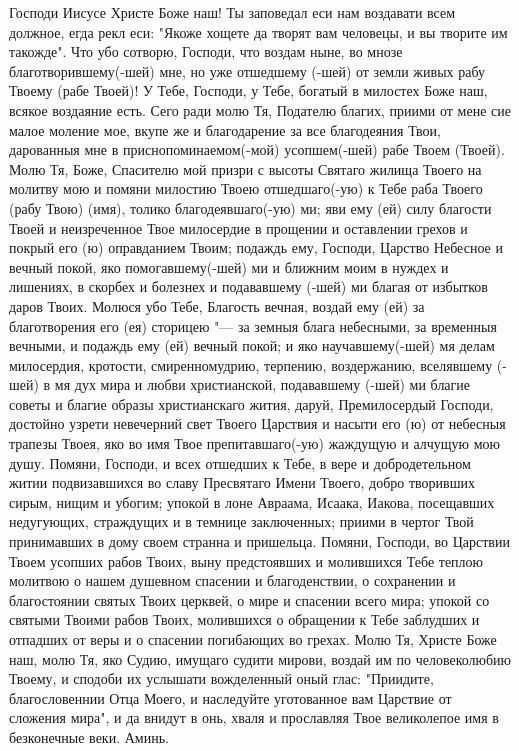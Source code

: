 \mychapterending

 


Господи Иисусе Христе Боже наш! Ты заповедал еси нам воздавати всем должное, егда рекл еси: "Якоже хощете да творят вам человецы, и вы творите им такожде". Что убо сотворю, Господи, что воздам ныне, во мнозе благотворившему(-шей) мне, но уже отшедшему (-шей) от земли живых рабу Твоему (рабе Твоей)! У Тебе, Господи, у Тебе, богатый в милостех Боже наш, всякое воздаяние есть. Сего ради молю Тя, Подателю благих, приими от мене сие малое моление мое, вкупе же и благодарение за все благодеяния Твои, дарованныя мне в приснопоминаемом(-мой) усопшем(-шей) рабе Твоем (Твоей). Молю Тя, Боже, Спасителю мой призри с высоты Святаго жилища Твоего на молитву мою и помяни милостию Твоею отшедшаго(-ую) к Тебе раба Твоего (рабу Твою) (имя), толико благодеявшаго(-ую) ми; яви ему (ей) силу благости Твоей и неизреченное Твое милосердие в прощении и оставлении грехов и покрый его (ю) оправданием Твоим; подаждь ему, Господи, Царство Небесное и вечный покой, яко помогавшему(-шей) ми и ближним моим в нуждех и лишениях, в скорбех и болезнех и подававшему (-шей) ми благая от избытков даров Твоих. Молюся убо Тебе, Благость вечная, воздай ему (ей) за благотворения его (ея) сторицею "--- за земныя блага небесными, за временныя вечными, и подаждь ему (ей) вечный покой; и яко научавшему(-шей) мя делам милосердия, кротости, смиренномудрию, терпению, воздержанию, вселявшему (-шей) в мя дух мира и любви христианской, подававшему (-шей) ми благие советы и благие образы христианскаго жития, даруй, Премилосердый Господи, достойно узрети невечерний свет Твоего Царствия и насыти его (ю) от небесныя трапезы Твоея, яко во имя Твое препитавшаго(-ую) жаждущую и алчущую мою душу. Помяни, Господи, и всех отшедших к Тебе, в вере и добродетельном житии подвизавшихся во славу Пресвятаго Имени Твоего, добро творивших сирым, нищим и убогим; упокой в лоне Авраама, Исаака, Иакова, посещавших недугующих, страждущих и в темнице заключенных; приими в чертог Твой принимавших в дому своем странна и пришельца. Помяни, Господи, во Царствии Твоем усопших рабов Твоих, выну предстоявших и молившихся Тебе теплою молитвою о нашем душевном спасении и благоденствии, о сохранении и благостоянии святых Твоих церквей, о мире и спасении всего мира; упокой со святыми Твоими рабов Твоих, молившихся о обращении к Тебе заблудших и отпадших от веры и о спасении погибающих во грехах. Молю Тя, Христе Боже наш, молю Тя, яко Судию, имущаго судити мирови, воздай им по человеколюбию Твоему, и сподоби их услышати вожделенный оный глас: "Приидите, благословеннии Отца Моего, и наследуйте уготованное вам Царствие от сложения мира", и да внидут в онь, хваля и прославляя Твое великолепое имя в безконечные веки. Аминь. 


